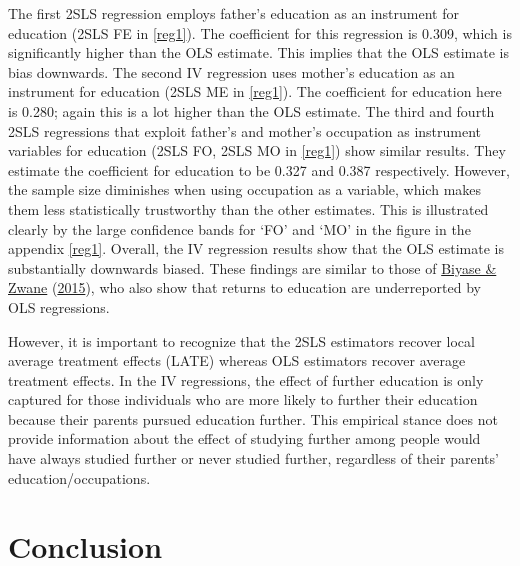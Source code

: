 \documentclass[11pt,preprint, authoryear]{elsarticle}
\numberwithin{equation}{section}
\numberwithin{figure}{section}
\numberwithin{table}{section}
\begin{document}
The first 2SLS regression employs father's education as an instrument
for education (2SLS FE in \ref{reg1}). The coefficient for this
regression is 0.309, which is significantly higher than the OLS
estimate. This implies that the OLS estimate is bias downwards. The
second IV regression uses mother's education as an instrument for
education (2SLS ME in \ref{reg1}). The coefficient for education here is
0.280; again this is a lot higher than the OLS estimate. The third and
fourth 2SLS regressions that exploit father's and mother's occupation as
instrument variables for education (2SLS FO, 2SLS MO in \ref{reg1}) show
similar results. They estimate the coefficient for education to be 0.327
and 0.387 respectively. However, the sample size diminishes when using
occupation as a variable, which makes them less statistically
trustworthy than the other estimates. This is illustrated clearly by the
large confidence bands for `FO' and `MO' in the figure in the appendix
\ref{reg1}. Overall, the IV regression results show that the OLS
estimate is substantially downwards biased. These findings are similar
to those of \protect\hyperlink{ref-agree}{Biyase \& Zwane}
(\protect\hyperlink{ref-agree}{2015}), who also show that returns to
education are underreported by OLS regressions.

However, it is important to recognize that the 2SLS estimators recover
local average treatment effects (LATE) whereas OLS estimators recover
average treatment effects. In the IV regressions, the effect of further
education is only captured for those individuals who are more likely to
further their education because their parents pursued education further.
This empirical stance does not provide information about the effect of
studying further among people would have always studied further or never
studied further, regardless of their parents' education/occupations.

\hypertarget{conclusion}{%
\section{\texorpdfstring{Conclusion
\label{conclusion}}{Conclusion }}\label{conclusion}}
\end{document}
